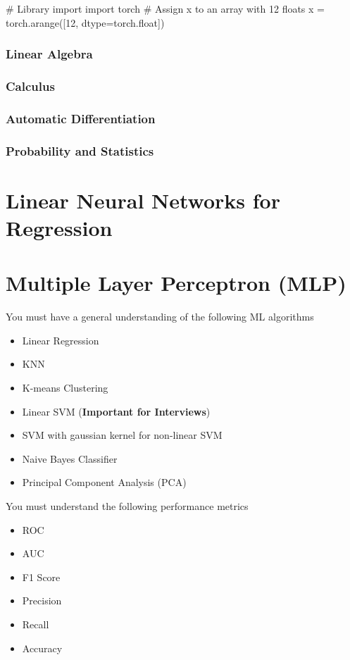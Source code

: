 \documentclass[12pt]{article}
\begin{document}
\begin{python}
# Library import
import torch
# Assign x to an array with 12 floats
x = torch.arange([12, dtype=torch.float])
\end{python}

\subsubsection{Linear Algebra}
\subsubsection{Calculus}
\subsubsection{Automatic Differentiation}
\subsubsection{Probability and Statistics}


\section{Linear Neural Networks for Regression}

\section{Multiple Layer Perceptron (MLP)}

You must have a general understanding of the following ML algorithms

\begin{itemize}
  \item Linear Regression
  \item KNN
  \item K-means Clustering
  \item Linear SVM (\textbf{Important for Interviews})
  \item SVM with gaussian kernel for non-linear SVM
  \item Naive Bayes Classifier
  \item Principal Component Analysis (PCA)
\end{itemize}

You must understand the following performance metrics

\begin{itemize}
  \item ROC
  \item AUC
  \item F1 Score
  \item Precision
  \item Recall
  \item Accuracy
\end{itemize}
\end{document}
